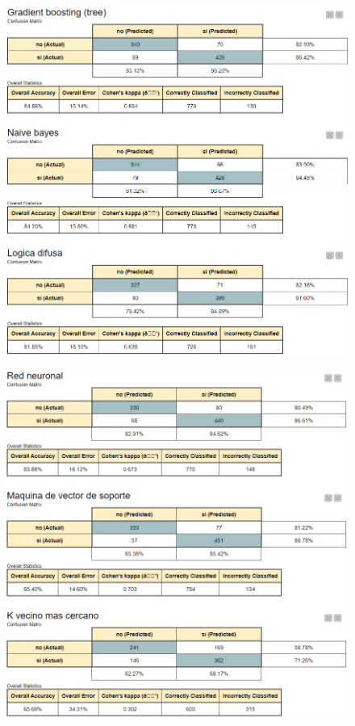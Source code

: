 \documentclass[12pt, letterpaper]{article}
\begin{document}
\begin{figure}
    \centering
    \includegraphics[scale=0.58]{tecnicas2.png}
    \caption{}
    \label{fig:tecnicas2}
\end{figure}

\begin{figure}
    \centering
    \includegraphics[scale=0.58]{tecnicas3.png}
    \caption{}
    \label{fig:tecnicas3}
\end{figure}
\end{document}
